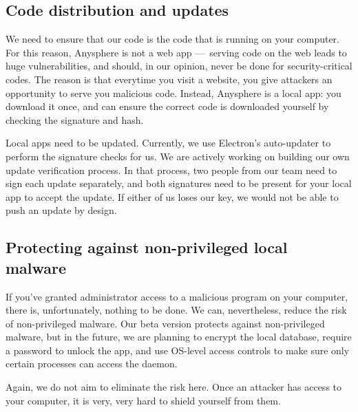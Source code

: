 \subsection{Code distribution and updates}

We need to ensure that our code is the code that is running on your computer. For this reason, Anysphere is not a web app — serving code on the web leads to huge vulnerabilities, and should, in our opinion, never be done for security-critical codes. The reason is that everytime you visit a website, you give attackers an opportunity to serve you malicious code. Instead, Anysphere is a local app: you download it once, and can ensure the correct code is downloaded yourself by checking the signature and hash.


Local apps need to be updated. Currently, we use Electron's auto-updater to perform the signature checks for us. We are actively working on building our own update verification process. In that process, two people from our team need to sign each update separately, and both signatures need to be present for your local app to accept the update. If either of us loses our key, we would not be able to push an update by design.

\subsection{Protecting against non-privileged local malware}

If you've granted administrator access to a malicious program on your computer, there is, unfortunately, nothing to be done. We can, nevertheless, reduce the risk of non-privileged malware. Our beta version protects against non-privileged malware, but in the future, we are planning to encrypt the local database, require a password to unlock the app, and use OS-level access controls to make sure only certain processes can access the daemon.

Again, we do not aim to eliminate the risk here. Once an attacker has access to your computer, it is very, very hard to shield yourself from them.
